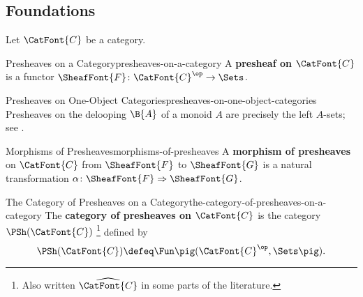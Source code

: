 \subsection{Foundations}\label{subsection-presheaves-foundations}
Let $\CatFont{C}$ be a category.
\begin{definition}{Presheaves on a Category}{presheaves-on-a-category}%
    A \textbf{presheaf on $\CatFont{C}$} is a functor $\SheafFont{F}\colon\smash{\CatFont{C}^{\op}}\to\Sets$.
\end{definition}
\begin{example}{Presheaves on One-Object Categories}{presheaves-on-one-object-categories}%
    Presheaves on the delooping $\B{A}$ of a monoid $A$ are precisely the left $A$-sets; see .
\end{example}
\begin{definition}{Morphisms of Presheaves}{morphisms-of-presheaves}%
    A \textbf{morphism of presheaves} on $\CatFont{C}$ from $\SheafFont{F}$ to $\SheafFont{G}$ is a natural transformation $\alpha\colon\SheafFont{F}\Rightarrow\SheafFont{G}$.
\end{definition}
\begin{definition}{The Category of Presheaves on a Category}{the-category-of-presheaves-on-a-category}%
    The \textbf{category of presheaves on $\CatFont{C}$} is the category $\PSh(\CatFont{C})$%
    \footnote{%
        Also written $\widehat{\CatFont{C}}$ in some parts of the literature.
        \par\vspace*{-1.75\baselineskip}
    } %
    defined by
    \[
        \PSh(\CatFont{C})
        \defeq
        \Fun\pig(\CatFont{C}^{\op},\Sets\pig).
    \]%
\end{definition}
